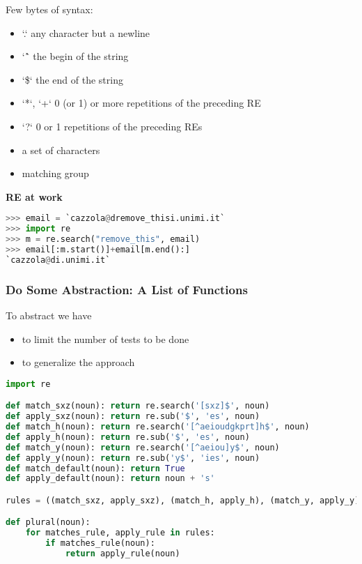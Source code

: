 Few bytes of syntax:
\begin{itemize}
	\item `.` any character but a newline
	\item `\^` the begin of the string
	\item `\$` the end of the string
	\item `*`, `+` 0 (or 1) or more repetitions of the preceding RE
	\item `?` 0 or 1 repetitions of the preceding REs
	\item [] a set of characters
	\item {} matching group
\end{itemize}

\textbf{RE at work}
\begin{lstlisting}[language=Python]
>>> email = `cazzola@dremove_thisi.unimi.it`
>>> import re
>>> m = re.search("remove_this", email)
>>> email[:m.start()]+email[m.end():]
`cazzola@di.unimi.it`
\end{lstlisting}

\subsubsection{Do Some Abstraction: A List of Functions}

To abstract we have
\begin{itemize}
	\item to limit the number of tests to be done
	\item to generalize the approach
\end{itemize}

\begin{lstlisting}[language=Python]
import re

def match_sxz(noun): return re.search('[sxz]$', noun)
def apply_sxz(noun): return re.sub('$', 'es', noun)
def match_h(noun): return re.search('[^aeioudgkprt]h$', noun)
def apply_h(noun): return re.sub('$', 'es', noun)
def match_y(noun): return re.search('[^aeiou]y$', noun)
def apply_y(noun): return re.sub('y$', 'ies', noun)
def match_default(noun): return True
def apply_default(noun): return noun + 's'

rules = ((match_sxz, apply_sxz), (match_h, apply_h), (match_y, apply_y), (match_default, apply_default))

def plural(noun):
	for matches_rule, apply_rule in rules:
		if matches_rule(noun):
			return apply_rule(noun)
\end{lstlisting}

